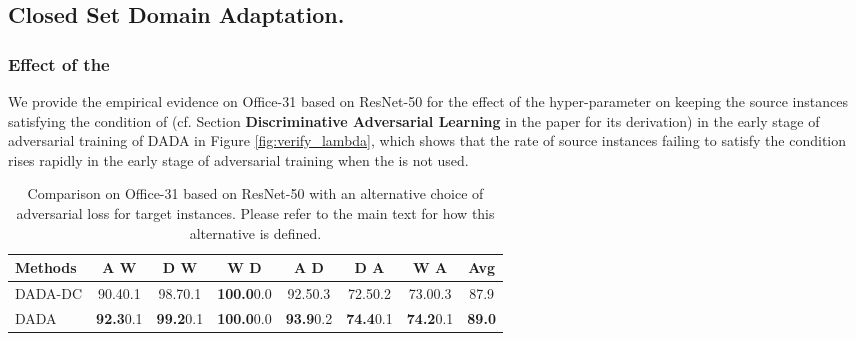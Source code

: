 \documentclass[letterpaper]{article} \usepackage{aaai20}  \usepackage{times}  \usepackage{helvet} \usepackage{courier}  \usepackage[hyphens]{url}  \usepackage{graphicx} \urlstyle{rm} \def\UrlFont{\rm}  \usepackage{graphicx}  \frenchspacing  \setlength{\pdfpagewidth}{8.5in}  \setlength{\pdfpageheight}{11in}
\begin{document}
\subsection{Closed Set Domain Adaptation. }
\subsubsection{Effect of the }
We provide the empirical evidence on Office-31 \cite{office31} based on ResNet-50 \cite{resnet} for the effect of the hyper-parameter  on keeping the source instances satisfying the condition of  (cf. Section \textbf{Discriminative Adversarial Learning} in the paper for its derivation) in the early stage of adversarial training of DADA in Figure \ref{fig:verify_lambda}, which shows that the rate of source instances failing to satisfy the condition rises rapidly in the early stage of adversarial training when the  is not used.

\begin{table*}[t]
	\caption{Comparison on Office-31 based on ResNet-50 with an alternative choice of adversarial loss for target instances. Please refer to the main text for how this alternative is defined.}
	\label{table:other_variants_office31}
	\begin{center}
		\begin{tabular}{lccccccc}
			\hline
			Methods     & A  W & D  W & W  D & A  D & D  A & W  A & Avg \\
			\hline
			
			DADA-DC     & 90.40.1 & 98.70.1 & \textbf{100.0}0.0 & 92.50.3 & 72.50.2 & 73.00.3 & 87.9 \\
			
			DADA        & \textbf{92.3}0.1 & \textbf{99.2}0.1 & \textbf{100.0}0.0 & \textbf{93.9}0.2 & \textbf{74.4}0.1 & \textbf{74.2}0.1 & \textbf{89.0} \\
			
			\hline
		\end{tabular}
	\end{center}
\end{table*}
\end{document}
